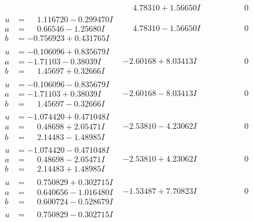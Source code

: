 \documentclass[1p]{elsarticle_modified}
\theoremstyle{definition}
\begin{document}
$$\begin{array}{c|c|c}
 & \phantom{-}4.78310 + 1.56650 I & \phantom{-0.000000 } 0 \\ \hline\begin{aligned}
u &= \phantom{-}1.116720 - 0.299470 I \\
a &= \phantom{-}0.66546 - 1.25680 I \\
b &= -0.756923 + 0.431765 I\end{aligned}
 & \phantom{-}4.78310 - 1.56650 I & \phantom{-0.000000 } 0 \\ \hline\begin{aligned}
u &= -0.106096 + 0.835679 I \\
a &= -1.71103 - 0.38039 I \\
b &= \phantom{-}1.45697 + 0.32666 I\end{aligned}
 & -2.60168 + 8.03413 I & \phantom{-0.000000 } 0 \\ \hline\begin{aligned}
u &= -0.106096 - 0.835679 I \\
a &= -1.71103 + 0.38039 I \\
b &= \phantom{-}1.45697 - 0.32666 I\end{aligned}
 & -2.60168 - 8.03413 I & \phantom{-0.000000 } 0 \\ \hline\begin{aligned}
u &= -1.074420 + 0.471048 I \\
a &= \phantom{-}0.48698 + 2.05471 I \\
b &= \phantom{-}2.14483 - 1.48985 I\end{aligned}
 & -2.53810 - 4.23062 I & \phantom{-0.000000 } 0 \\ \hline\begin{aligned}
u &= -1.074420 - 0.471048 I \\
a &= \phantom{-}0.48698 - 2.05471 I \\
b &= \phantom{-}2.14483 + 1.48985 I\end{aligned}
 & -2.53810 + 4.23062 I & \phantom{-0.000000 } 0 \\ \hline\begin{aligned}
u &= \phantom{-}0.750829 + 0.302715 I \\
a &= \phantom{-}0.640656 - 1.016480 I \\
b &= \phantom{-}0.600724 - 0.528679 I\end{aligned}
 & -1.53487 + 7.70823 I & \phantom{-0.000000 } 0 \\ \hline\begin{aligned}
u &= \phantom{-}0.750829 - 0.302715 I \\

\end{aligned}
\end{array}$$
\end{document}
